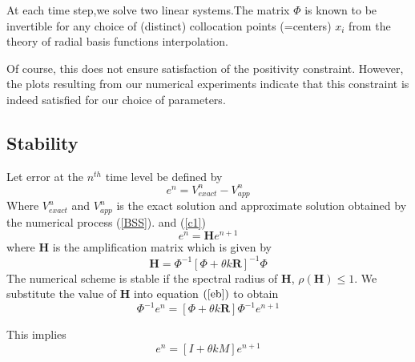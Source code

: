 \documentclass[12pt]{article}
\numberwithin{equation}{subsection} %
\newcommand{\sect}[1]{%
\cleardoublepage
\clearpage
\newpage
\begin{center}
\addtocounter{section} {1}
\setcounter{subsection} {0}
\section* {\normalsize \bf{CHAPTER \thesection \\ #1}}
\addcontentsline{toc}{section}{CHAPTER
\protect\numberline{\thesection : } #1\dotfill}
\end{center}
\thispagestyle{myheadings} }
\begin{document}
At each time step,we solve two linear systems.The matrix $\Phi$ is
known to be invertible for any choice of (distinct) collocation
points (=centers) $x_i$ from the theory of radial basis functions
interpolation.


Of course, this does not ensure satisfaction of the positivity
constraint. However, the plots resulting from our numerical
experiments indicate that this constraint is indeed satisfied for
our choice of parameters.
\subsection{Stability}

Let error at the $n^{th}$ time level be defined by
\begin{equation}
e^n=V^{n}_{exact}-V^{n}_{app}
\end{equation}
Where $V^{n}_{exact}$ and $V^{n}_{app}$ is the exact solution and
approximate solution obtained by the numerical process (\ref{BSS}).
and (\ref{c1})
\begin{equation}\label{eb}
e^n=\textbf{H}e^{n+1}
\end{equation}
where \textbf{H} is the amplification matrix which is given by
\begin{equation}
\textbf{H}=\Phi^{-1}[\Phi +\theta k \textbf{R}]^{-1}\Phi
\end{equation}
 The numerical scheme is stable if the spectral radius  of \textbf{H}, $\rho(\textbf{H})\leq
 1$.
We substitute the value of \textbf{H} into equation $(\ref{eb})$ to
obtain
\begin{equation}
[\Phi-(1-\theta)k M]\Phi^{-1}e^{n}=[\Phi +\theta k
\textbf{R}]\Phi^{-1}e^{n+1}
\end{equation}

This implies
\begin{equation}
[I-(1-\theta)kM)]e^{n}=[I+\theta kM]e^{n+1}
\end{equation}
\end{document}
